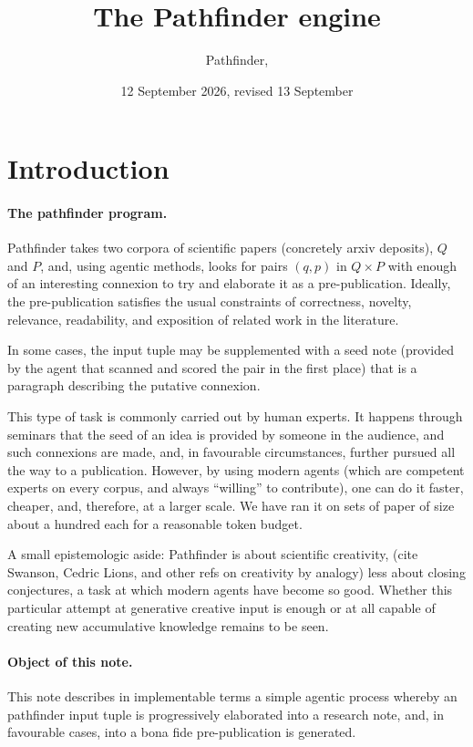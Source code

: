 \documentclass[11pt,a4paper]{article}
\title{The Pathfinder engine}
\author{Pathfinder, \file{github.com/vd1/pathfinder}}
\date{12 September 2026, revised 13 September}
\begin{document}
\maketitle

\begin{abstract}
  
\end{abstract}

\section{Introduction}

\paragraph{The pathfinder program.} Pathfinder takes two corpora of scientific
papers (concretely arxiv deposits), $Q$ and $P$, and, using agentic methods, looks for
pairs $(q, p)$ in $Q\times P$ with enough of an interesting connexion to try and
elaborate it as a pre-publication. Ideally, the pre-publication satisfies the
usual constraints of correctness, novelty, relevance, readability, and
exposition of related work in the literature. 

In some cases, the input tuple may be supplemented with a seed note (provided by
the agent that scanned and scored the pair in the first place) that is a
paragraph describing the putative connexion.

This type of task is commonly carried out by human experts. It happens through
seminars that the seed of an idea is provided by someone in the audience, and
such connexions are made, and, in favourable circumstances, further pursued all
the way to a publication. However, by using modern agents (which are competent
experts on every corpus, and always ``willing'' to contribute), one can do it
faster, cheaper, and, therefore, at a larger scale. We have ran it on sets of 
paper of size about a hundred each for a reasonable token budget.

A small epistemologic aside: Pathfinder is about scientific creativity,
(cite Swanson, Cedric Lions, and other refs on creativity by analogy) 
less about closing conjectures, a task at which modern agents have become so good.
Whether this particular attempt at generative creative input is enough or at all capable
of creating new accumulative knowledge remains to be seen.

\paragraph{Object of this note.}
This note describes in implementable terms a simple agentic process
whereby an pathfinder input tuple is progressively elaborated into a research note, and, in
favourable cases, into a bona fide pre-publication is generated. 
\end{document}
